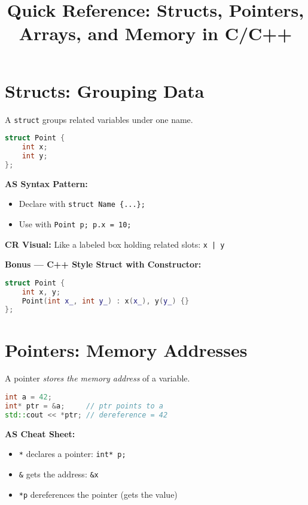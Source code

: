 \documentclass{article}
\title{Quick Reference: Structs, Pointers, Arrays, and Memory in C/C++}
\author{}
\date{}
\begin{document}
\maketitle

\section*{Structs: Grouping Data}

A \texttt{struct} groups related variables under one name.

\begin{lstlisting}[language=C++]
struct Point {
    int x;
    int y;
};
\end{lstlisting}

\textbf{AS Syntax Pattern:}
\begin{itemize}
    \item Declare with \texttt{struct Name \{...\};}
    \item Use with \texttt{Point p; p.x = 10;}
\end{itemize}

\textbf{CR Visual:} Like a labeled box holding related slots: \texttt{x | y}

\vspace{0.5em}
\textbf{Bonus — C++ Style Struct with Constructor:}

\begin{lstlisting}[language=C++]
struct Point {
    int x, y;
    Point(int x_, int y_) : x(x_), y(y_) {}
};
\end{lstlisting}

\section*{Pointers: Memory Addresses}

A pointer \textit{stores the memory address} of a variable.

\begin{lstlisting}[language=C++]
int a = 42;
int* ptr = &a;     // ptr points to a
std::cout << *ptr; // dereference = 42
\end{lstlisting}

\textbf{AS Cheat Sheet:}
\begin{itemize}
    \item \texttt{*} declares a pointer: \texttt{int* p;}
    \item \texttt{\&} gets the address: \texttt{\&x}
    \item \texttt{*p} dereferences the pointer (gets the value)
\end{itemize}
\end{document}
